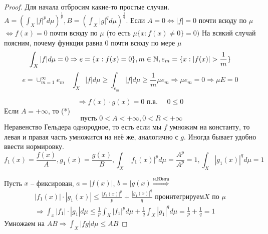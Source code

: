 \documentclass[document]{subfiles}
\begin{document}
\begin{proof}
Для начала отбросим какие-то простые случаи. \\
$A = \left( \int_X |f|^p d \mu \right)^{\frac{1}{p}}, B = \left( \int_X |g|^q d \mu \right)^{\frac{1}{q}}$.
Если $A = 0 \Leftrightarrow |f| = 0$ почти всюду по $\mu$ $\Leftrightarrow f(x) = 0$ почти всюду по $\mu$ (то есть $\mu \{x: f(x) \ne 0 \} = 0)$
На всякий случай поясним, почему функция равна 0 почти всюду по мере $\mu$
\[ \int_X |f| d \mu = 0 \Rightarrow e = \{x: f(x) = 0 \}, m \in \mathbb{N}, e_m = \{x: |f(x)| > \frac{1}{m} \} \]
\[e = \cup^\infty_{m=1} e_m \quad \int_X |f| d \mu \geq \int_{e_m} |f| d\mu \geq \frac{1}{m} \mu e_m \Rightarrow \mu e_m = 0 \Rightarrow \mu E = 0 \]

\[ \Rightarrow f(x) \cdot g(x) = 0 \text { п.в. } \quad 0 \leq 0 \tag{*} \]
Если $A = +\infty$, то (*) 
\[ \text{ пусть } 0 < A < +\infty, 0 < R < +\infty \]
Неравенство Гельдера однородное, то есть если мы $f$ умножим на константу, то левая и правая часть умножится на неё же, аналогично с $g$. Иногда
бывает удобно ввести нормировку.
\[ f_1(x) = \frac{f(x)}{A}, g_1(x) = \frac{g(x)}{B}, \int_X |f_1(x)|^p d\mu = \frac{A^p}{A^p} = 1, \int_X |g_1(x)|^q d \mu = 1 \]

Пусть $x$ -- фиксирован, $a = |f(x)|$, $b = |g(x) \stackrel{\text{н.Юнга}}{\Rightarrow}$ 
\begin{multline*}
    |f_1(x)| \cdot |g_1(x)| \leq \frac{|f_1(x)|^p}{p} + \frac{|g_1(x)|^q}{q} \text{ проинтегрируем} X \text { по } \mu \\
    \Rightarrow \int_x |f_1| \cdot |g_1| d \mu \leq \frac{1}{p} \int_X |f_1|^p d\mu + \frac{1}{q} \int_X |g_1|^q d\mu = \frac{1}{p} + \frac{1}{q} = 1
\end{multline*}
Умножаем на $AB \Rightarrow \int_X |fg| d \mu \leq AB $
\end{proof}
\end{document}
